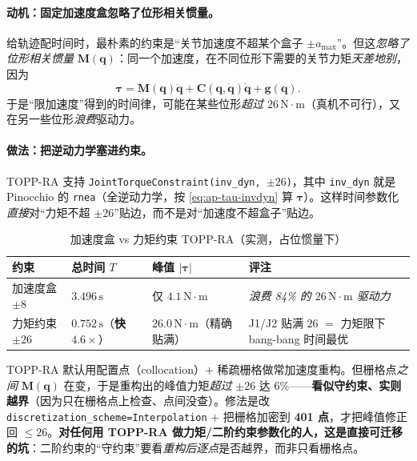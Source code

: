 \paragraph{动机：固定加速度盒忽略了位形相关惯量。}
给轨迹配时间时，最朴素的约束是“关节加速度不超某个盒子 $\pm a_{\max}$”。但这\emph{忽略了位形相关惯量} $\mathbf{M}(\mathbf{q})$：同一个加速度，在不同位形下需要的关节力矩\emph{天差地别}，因为
\begin{equation}
  \boldsymbol{\tau}=\mathbf{M}(\mathbf{q})\ddot{\mathbf{q}}+\mathbf{C}(\mathbf{q},\dot{\mathbf{q}})\dot{\mathbf{q}}+\mathbf{g}(\mathbf{q}).
  \label{eq:ap-tau-invdyn}
\end{equation}
于是“限加速度”得到的时间律，可能在某些位形\emph{超过} $26\,\mathrm{N\!\cdot\! m}$（真机不可行），又在另一些位形\emph{浪费}驱动力。

\paragraph{做法：把逆动力学塞进约束。}
TOPP-RA 支持 \texttt{JointTorqueConstraint(inv\_dyn, $\pm 26$)}，其中 \texttt{inv\_dyn} 就是 Pinocchio 的 \texttt{rnea}（全逆动力学，按 \cref{eq:ap-tau-invdyn} 算 $\boldsymbol{\tau}$）。这样时间参数化\emph{直接}对“力矩不超 $\pm 26$”贴边，而不是对“加速度不超盒子”贴边。

\begin{table}[H]\centering\small
\caption{加速度盒 vs 力矩约束 TOPP-RA（实测，占位惯量下）}
\begin{tabular}{p{} p{} p{} p{}}
\toprule
约束 & 总时间 $T$ & 峰值 $|\boldsymbol{\tau}|$ & 评注 \\
\midrule
加速度盒 $\pm 8$ & $3.496\,\mathrm{s}$ & 仅 $4.1\,\mathrm{N\!\cdot\! m}$ & \emph{浪费 84\% 的 $26\,\mathrm{N\!\cdot\! m}$ 驱动力} \\
力矩约束 $\pm 26$ & $0.752\,\mathrm{s}$（\textbf{快 $4.6\times$}）& $26.0\,\mathrm{N\!\cdot\! m}$（精确贴满）& J1/J2 贴满 $26$ $=$ 力矩限下 bang-bang 时间最优 \\
\bottomrule
\end{tabular}
\label{tab:ap-topp}
\end{table}

\begin{pitfall}\label{pit:ap-topp-disc}
TOPP-RA 默认用配置点（collocation）$+$ 稀疏栅格做常加速度重构。但栅格点\emph{之间} $\mathbf{M}(\mathbf{q})$ 在变，于是重构出的峰值力矩\emph{超过} $\pm 26$ 达 $6\%$——\textbf{看似守约束、实则越界}（因为只在栅格点上检查、点间没查）。修法是改 \texttt{discretization\_scheme=Interpolation} $+$ 把栅格加密到 \textbf{401 点}，才把峰值修正回 $\le 26$。\textbf{对任何用 TOPP-RA 做力矩/二阶约束参数化的人，这是直接可迁移的坑}：二阶约束的“守约束”要看\emph{重构后逐点}是否越界，而非只看栅格点。
\end{pitfall}

